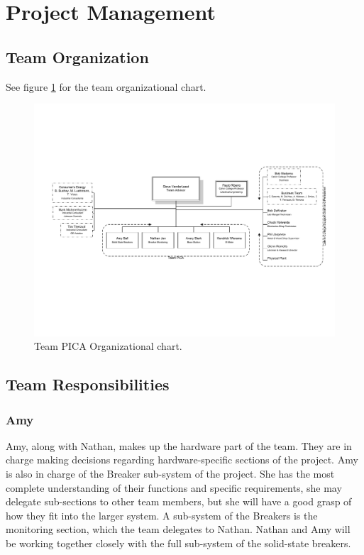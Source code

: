 \section{Project Management}
\subsection{Team Organization}
See figure \ref{fig:orgchart} for the team organizational chart.

\begin{figure}[htbp]
\begin{center}
\includegraphics[width=6.5in]{figures/TeamOrgChart}
\caption{Team PICA Organizational chart.}
\label{fig:orgchart}
\end{center}
\end{figure}

\subsection{Team Responsibilities}
\subsubsection{Amy}
Amy, along with Nathan, makes up the hardware part of the team. They are in charge making decisions regarding hardware-specific sections of the project. Amy is also in charge of the Breaker sub-system of the project. She has the most complete understanding of their functions and specific requirements, she may delegate sub-sections to other team members, but she will have a good grasp of how they fit into the larger system. A sub-system of the Breakers is the monitoring section, which the team delegates to Nathan. Nathan and Amy will be working together closely with the full sub-system of the solid-state breakers.

